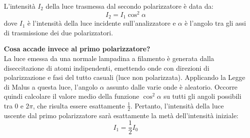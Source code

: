 \documentclass[openany,a4paper,12pt]{book}
\begin{document}
\begin{definizione}[title=Legge di Malus]
    L'intensità $I_2$ della luce trasmessa dal secondo polarizzatore è data da:
    \begin{equation}
        I_2 = I_1 \cos^2 \alpha
    \end{equation}
    dove $I_1$ è l'intensità della luce incidente sull'analizzatore e $\alpha$ è l'angolo tra gli assi di trasmissione dei due polarizzatori.
\end{definizione}

\textbf{Cosa accade invece al primo polarizzatore?} \\
La luce emessa da una normale lampadina a filamento è generata dalla diseccitazione di atomi indipendenti, emettendo onde con direzioni di polarizzazione e fasi del tutto casuali (luce non polarizzata). 
Applicando la Legge di Malus a questa luce, l'angolo $\alpha$ assunto dalle varie onde è aleatorio. Occorre quindi calcolare il valore medio della funzione $\cos^2 \alpha$ su tutti gli angoli possibili tra $0$ e $2\pi$, che risulta essere esattamente $\frac{1}{2}$. 
Pertanto, l'intensità della luce uscente dal primo polarizzatore sarà esattamente la metà dell'intensità iniziale:
\begin{equation}
    I_1 = \frac{1}{2}I_0
\end{equation}
\end{document}
